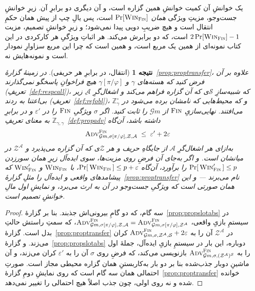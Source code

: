 \documentclass[10pt,oneside,openany]{book}
\newcommand{\Zenv}{\mathcal{Z}}
\newcommand{\Adv}{\mathcal{A}}
\newcommand{\Sim}{\mathcal{S}}
\newcommand{\advtg}{\op{Adv}}
\newcommand{\padv}[2]{\advtg^{#1}_{#2}}
\newcommand{\ZenvSet}{\mathbb{Z}}
\newcommand{\op}[1]{\textnormal{\textsc{#1}}}
\newcommand{\Gm}{\mathcal{G}m}
\newcommand{\Win}{\op{Win}}
\theoremstyle{accentdef}
\theoremstyle{accentplain}
\newtheorem{corollary}[definition]{نتیجه}
\begin{document}
یک خوانشِ آن کمیت خوانشِ همین گزاره است، و آن دیگری دو برابرِ آن. زیرِ
خوانشِ جست‌وجو، مزیتِ ویژگی \emph{همان} $\Pr[\Win_{\op{Fin}}]$ است، پس یالِ
چپ از پیش همان حکمِ انتقال است و هیچ ضریبِ دویی پیدا نمی‌شود؛ و زیرِ خوانشِ
تصمیم، مزیت $2\Pr[\Win_{\op{Fin}}]-1$ است، که دو برابرش می‌کند. هر
اثباتِ ویژگیِ هر کارکردی در این کتاب نمونه‌ای از همین یک مربع است، و همین
است که چرا این مربع سزاوارِ نمودار است و نمونه‌هایش نه.

\begin{corollary}[انتقال، در برابرِ هر حریفی]\label{cor:proptransfer2}
در زمینهٔ گزارهٔ~\ref{prop:proptransfer}، علاوه بر آن فرض کنید که هسته‌های
$\gamma$ و $\gamma[\pi/\varphi]$ هیچ فراخوانِ پاسخگو نمی‌گذارند
(تعریفِ~\ref{def:respcall})، که شبیه‌سازِ $\Sim$ی که آن گزاره فراهم می‌کند
و اشغال‌گرِ $\Adv$ِ زیر بی‌اعتنا به ردند (تعریفِ~\ref{def:refobl})، و که
محیط‌هایی که نامشان برده می‌شود در $\ZenvSet^{\circ}_{\gamma}$ می‌افتند.
نهایی‌سازیِ $\op{Fin}$ از $\Gm$ را ثابت کنید. اگر $\sigma$ ویژگیِ
$\op{Fin}$ را در $\varepsilon'$ و در برابرِ $\ZenvSet_{\gamma,\gamma}$ به
معنای تعریفِ~\ref{def:propadv} داشته باشد، آن‌گاه
\[
  \padv{\op{Fin}}{\Gm,\sigma[\pi/\varphi],\Zenv,\Adv} \;\leq\; \varepsilon' + 2\varepsilon
\]
به‌ازای هر اشغال‌گرِ $\Adv$ از جایگاهِ حریف و هر $\Zenv$ی که آن گزاره
می‌پذیرد و $\Zenv^{\Adv}$ در میانشان است. و اگر به‌جای آن فرضِ روی
مزیت‌ها، سوی ایده‌آل زیرِ همان سور‌زدن $\Pr[\,\Win'_{\op{Fin}}\,] \leq p$ را
برآورد، آن‌گاه $\Pr[\,\Win_{\op{Fin}}\,] \leq p + \varepsilon$، با
$\Win_{\op{Fin}}$ و $\Win'_{\op{Fin}}$ که پیشامدهای واقعی و ایده‌آل را
مثلِ گزارهٔ~\ref{prop:proptransfer} نام می‌برند --- و این همان صورتی است که
ویژگیِ جست‌وجو در آن به ارث می‌برد، و نمایشِ اول مالِ خوانشِ تصمیم است.
\end{corollary}

\begin{proof}
سه گام، که دو گامِ بیرونی‌اش جذبند. بنا بر
گزارهٔ~\ref{prop:propslotabs} در سیستمِ بازیِ واقعی،
$\padv{\op{Fin}}{\Gm,\sigma[\pi/\varphi],\Zenv,\Adv} =
\padv{\op{Fin}}{\Gm,\sigma[\pi/\varphi],\Zenv^{\Adv}}$، که سمتِ راستش
حالتِ بدل است. گزارهٔ~\ref{prop:proptransfer} در $\Zenv^{\Adv}$ آن را به
$\padv{\op{Fin}}{\Gm,\sigma,\Zenv^{\Adv},\Sim} + 2\varepsilon$ کران
می‌زند. و گزارهٔ~\ref{prop:propslotabs} دوباره، این بار در سیستمِ بازیِ
ایده‌آل، جملهٔ اول را به
$\padv{\op{Fin}}{\Gm,\sigma,(\Zenv^{\Adv})^{\Sim}}$ بازنویسی می‌کند، که
فرضِ روی $\sigma$ آن را به $\varepsilon'$ کران می‌زند، و آن ماشینِ دوبار
جذب‌شده بنا بر دو بار به‌کاربستنِ همان گزاره محیطی مجاز است. صورتِ احتمالی
همان سه گام است که روی نمایشِ دومِ گزارهٔ~\ref{prop:proptransfer} خوانده
شده و نه روی اولی، چون جذب اصلاً هیچ احتمالی را تغییر نمی‌دهد.
\end{proof}
\end{document}
